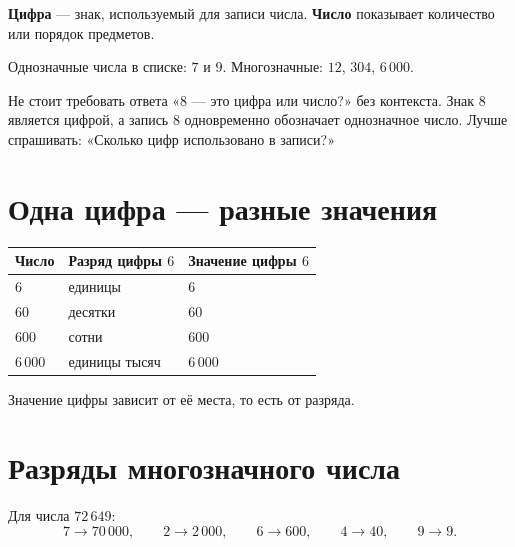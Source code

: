 \begin{propertybox}[Определения]
  \textbf{Цифра} --- знак, используемый для записи числа.
  \textbf{Число} показывает количество или порядок предметов.
\end{propertybox}

Однозначные числа в списке: \(7\) и \(9\). Многозначные: \(12\), \(304\),
\(6\,000\).

\begin{teacherbox}
  Не стоит требовать ответа «\(8\) --- это цифра или число?» без контекста.
  Знак \(8\) является цифрой, а запись \(8\) одновременно обозначает
  однозначное число. Лучше спрашивать: «Сколько цифр использовано в записи?»
\end{teacherbox}

\section{Одна цифра --- разные значения}

\begin{center}
  \renewcommand{\arraystretch}{1.45}
  \begin{tabularx}{0.94\textwidth}{@{}>{\centering\arraybackslash}p{}>{\centering\arraybackslash}p{}X@{}}
    \toprule
    \rowcolor{TableHeader}
    Число & Разряд цифры \(6\) & Значение цифры \(6\) \\
    \midrule
    \(6\) & единицы & \(6\) \\
    \(60\) & десятки & \(60\) \\
    \(600\) & сотни & \(600\) \\
    \(6\,000\) & единицы тысяч & \(6\,000\) \\
    \bottomrule
  \end{tabularx}
\end{center}

\begin{conclusionbox}
  Значение цифры зависит от её места, то есть от разряда.
\end{conclusionbox}

\section{Разряды многозначного числа}

\placevalueworksheetfigure

Для числа \(72\,649\):
\[
  7\rightarrow70\,000,\qquad
  2\rightarrow2\,000,\qquad
  6\rightarrow600,\qquad
  4\rightarrow40,\qquad
  9\rightarrow9.
\]

